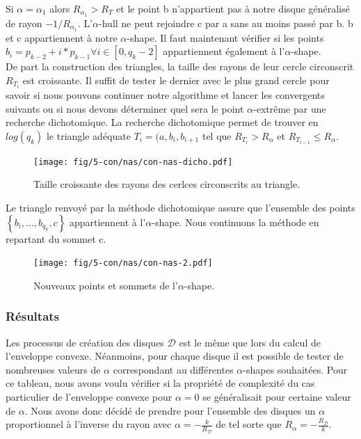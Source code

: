 Si $\alpha = \alpha_{1}$ alors \textbf{$R_{\alpha_{1}} > R_T$} et le point b n'appartient pas à notre disque généralisé de rayon $-1/R_{\alpha_{1}}$. L'$\alpha$-hull ne peut rejoindre c par a sans au moins passé par b. b et c appartiennent à notre $\alpha$-shape. Il faut maintenant vérifier si les points $b_i = p_{k-2} + i*p_{k-1} \forall i \in [0, q_k-2]$ appartiennent également à l'$\alpha$-shape. \\

De part la construction des triangles, la taille des rayons de leur cercle circonscrit $R_{T_{i}}$ est croissante. Il suffit de tester le dernier avec le plus grand cercle pour savoir si nous pouvons continuer notre algorithme et lancer les convergents suivants ou si nous devons déterminer quel sera le point $\alpha$-extrême par une recherche dichotomique. La recherche dichotomique permet de trouver en $log(q_k)$ le triangle adéquate $T_i = (a, b_{i}, b_{i+1}$ tel que $R_{T_i} > R_{\alpha}$ et $R_{T_{i-1}} \leq R_{\alpha}$.

\begin{figure}[H]
  \centering
  \texttt{[image: fig/5-con/nas/con-nas-dicho.pdf]}
  \caption{Taille croissante des rayons des cerlces circonscrits au triangle.}
\end{figure}

Le triangle renvoyé par la méthode dichotomique assure que l'ensemble des points $\left\{ b_{i},\ldots, b_{q_k}, c \right\}$ appartiennent à l'$\alpha$-shape. Nous continuons la méthode en repartant du sommet c.
 
\begin{figure}[H]
  \centering
  \texttt{[image: fig/5-con/nas/con-nas-2.pdf]}
  \caption{Nouveaux points et sommets de l'$\alpha$-shape.}
\end{figure}


\subsubsection{Résultats}

Les processus de création des disques $\mathcal{D}$ est le même que lors du calcul de l'enveloppe convexe. Néanmoins, pour chaque disque il est possible de tester de nombreuses valeurs de $\alpha$ correspondant au différentes $\alpha$-shapes souhaitées. Pour ce tableau, nous avons voulu vérifier si la propriété de complexité du cas particulier de l'enveloppe convexe pour $\alpha = 0$ se généralisait pour certaine valeur de $\alpha$. Nous avons donc décidé de prendre pour l'ensemble des disques un $\alpha$ proportionnel à l'inverse du rayon avec $\alpha = -\frac{k}{R_{\mathcal{D}}}$ de tel sorte que $R_{\alpha} = -\frac{R_{\mathcal{D}}}{k}$.
 

